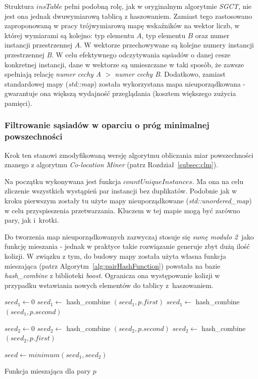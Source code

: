\documentclass[12pt]{article}
\begin{document}
Struktura $ insTable $ pełni podobną rolę, jak w oryginalnym algorytmie \textit{SGCT}, nie jest ona jednak dwuwymiarową tablicą z haszowaniem. Zamiast tego zastosowano zaproponowaną w pracy \cite{plane} trójwymiarową mapę wskaźników na wektor liczb, w której wymiarami są kolejno: typ elementu $ A $, typ elementu $ B $ oraz numer instancji przestrzennej $ A $.  W wektorze przechowywane są kolejne numery instancji przestrzennej \textit{B}. W celu efektywnego odczytywania sąsiadów o danej cesze konkretnej instancji, dane w wektorze są umieszczane w taki sposób, że zawsze spełniają relację \textit{numer cechy A} $ > $ \textit{numer cechy B}. Dodatkowo, zamiast standardowej mapy (\textit{std::map}) została wykorzystana mapa nieuporządkowana - gwarantuje ona większą wydajność przeglądania (kosztem większego zużycia pamięci).

\subsubsection{Filtrowanie sąsiadów w oparciu o próg minimalnej powszechności}

Krok ten stanowi zmodyfikowaną wersję algorytmu obliczania miar powszechności znanego z algorytmu \textit{Co-location Miner} (patrz Rozdział~\ref{subsec:clm}).

Na początku wykonywana jest funkcja $ countUniqueInstances$. Ma ona na celu zliczenie wszystkich wystąpień par instancji bez duplikatów. Podobnie jak w kroku pierwszym zostały tu użyte mapy nieuporządkowane (\textit{std::unordered\_map}) w celu przyspieszenia przetwarzania.
Kluczem w tej mapie mogą być zarówno pary, jak i~krotki.

Do tworzenia map nieuporządkowanych zazwyczaj stosuje się \textit{sumę modulo 2}~jako funkcję mieszania - jednak w praktyce takie rozwiązanie generuje zbyt dużą ilość kolizji. W związku z tym, do budowy mapy została użyta własna funkcja mieszająca (patrz Algorytm~\ref{alg:pairHashFunction}) powstała na bazie \textit{hash\_combine} z biblioteki \textit{boost}. Ogranicza ona występowanie kolizji w przypadku wstawiania nowych elementów do tablicy z~haszowaniem. 

\begin{algorithm}
$ seed_1 \leftarrow 0 $\;
$ seed_1 \leftarrow $ hash\_combine $(seed_1, p.first) $\;
$ seed_1 \leftarrow $ hash\_combine $(seed_1, p.second) $\;

$ seed_2 \leftarrow 0 $\;
$ seed_2 \leftarrow $ hash\_combine $(seed_2, p.second) $\;
$ seed_2 \leftarrow $ hash\_combine $(seed_2, p.first) $\;

$ seed \leftarrow minimum(seed_1, seed_2) $\;

\caption{Funkcja mieszająca dla pary $p$}
\label{alg:pairHashFunction}
\end{algorithm}
\end{document}
